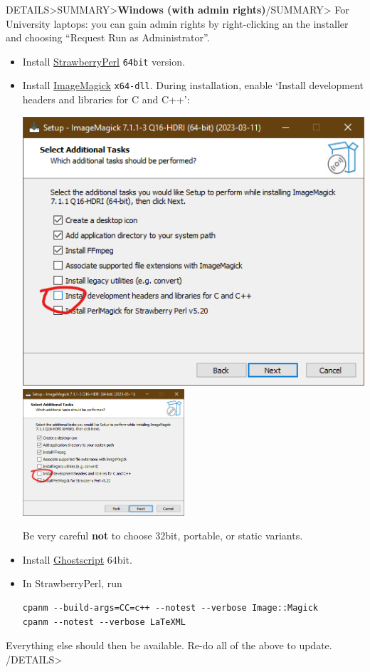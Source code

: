 \documentclass[a4paper,british]{article}
\newenvironment{foldedframe}[1][]{%
    \<DETAILS>\<SUMMARY>\textbf{#1}\</SUMMARY>}%
  {\</DETAILS>}
\newenvironment{foldedframe}[1][]{\bgroup\colorlet{TFFrameColor}{SpringGreen}
  \colorlet{TFTitleColor}{black}\begin{titled-frame}{#1}}{\end{titled-frame}\egroup}
\begin{document}
\begin{foldedframe}[Windows (with admin rights)]
  For University laptops: you can gain admin rights by right-clicking an the installer and choosing ``Request Run as Administrator''.
  \begin{itemize}
    \item Install \href{https://strawberryperl.com/}{StrawberryPerl} \texttt{64bit} version.
    \item Install \href{https://imagemagick.org/script/download.php#windows}{ImageMagick} \texttt{x64-dll}. During installation, enable `Install development headers and libraries for C and C++':
    \begin{center}
      \iflatexml
        \includegraphics{imagemagick-installer-screenshot.png}
      \else
        \includegraphics[width=6cm]{imagemagick-installer-screenshot.png}
      \fi
    \end{center}
    Be very careful \textbf{not} to choose 32bit, portable, or static variants.
    \item Install \href{https://www.ghostscript.com/download/gsdnld.html}{Ghostscript} 64bit.
    \item In StrawberryPerl, run
          \begin{lstlisting}
cpanm --build-args=CC=c++ --notest --verbose Image::Magick
cpanm --notest --verbose LaTeXML
    \end{lstlisting}
  \end{itemize}
  Everything else should then be available. Re-do all of the above to update.
\end{foldedframe}
\end{document}

